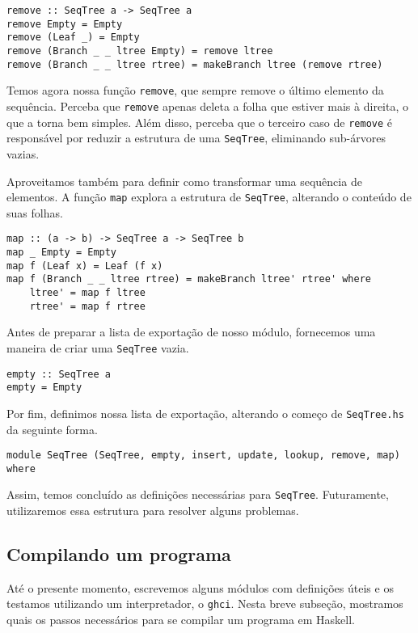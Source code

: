 \documentclass[a4paper]{article}
\begin{document}
\begin{verbatim}
remove :: SeqTree a -> SeqTree a
remove Empty = Empty
remove (Leaf _) = Empty
remove (Branch _ _ ltree Empty) = remove ltree
remove (Branch _ _ ltree rtree) = makeBranch ltree (remove rtree)
\end{verbatim}

Temos agora nossa função \texttt{remove}, que sempre remove o último elemento da sequência.
Perceba que \texttt{remove} apenas deleta a folha que estiver mais à direita, o que a torna bem simples.
Além disso, perceba que o terceiro caso de \texttt{remove} é responsável por reduzir a estrutura de uma \texttt{SeqTree}, eliminando sub-árvores vazias.

Aproveitamos também para definir como transformar uma sequência de elementos.
A função \texttt{map} explora a estrutura de \texttt{SeqTree}, alterando o conteúdo de suas folhas.

\begin{verbatim}
map :: (a -> b) -> SeqTree a -> SeqTree b
map _ Empty = Empty
map f (Leaf x) = Leaf (f x)
map f (Branch _ _ ltree rtree) = makeBranch ltree' rtree' where
	ltree' = map f ltree
	rtree' = map f rtree
\end{verbatim}

Antes de preparar a lista de exportação de nosso módulo, fornecemos uma maneira de criar uma \texttt{SeqTree} vazia.

\begin{verbatim}
empty :: SeqTree a
empty = Empty
\end{verbatim}

Por fim, definimos nossa lista de exportação, alterando o começo de \texttt{SeqTree.hs} da seguinte forma.

\begin{verbatim}
module SeqTree (SeqTree, empty, insert, update, lookup, remove, map) where
\end{verbatim}

Assim, temos concluído as definições necessárias para \texttt{SeqTree}.
Futuramente, utilizaremos essa estrutura para resolver alguns problemas.

\subsection{Compilando um programa}	\label{subsec:compiling}

Até o presente momento, escrevemos alguns módulos com definições úteis e os testamos utilizando um interpretador, o \texttt{ghci}.
Nesta breve subseção, mostramos quais os passos necessários para se compilar um programa em Haskell.
\end{document}
